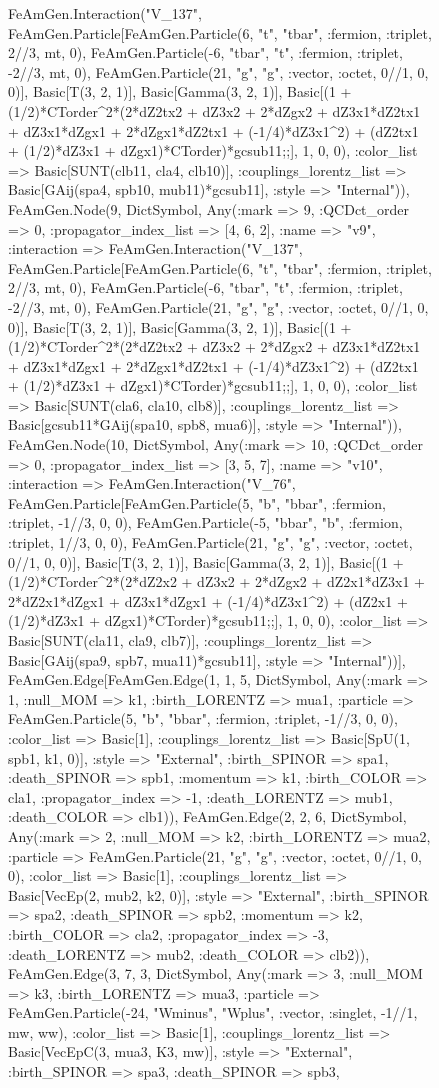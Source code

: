 \documentclass{revtex4}
\begin{document}
\begin{figure}[!htb]
\begin{center}
{FeAmGen.Interaction("V_137", FeAmGen.Particle[FeAmGen.Particle(6, "t", "tbar", :fermion, :triplet, 2//3, mt, 0), FeAmGen.Particle(-6, "tbar", "t", :fermion, :triplet, -2//3, mt, 0), FeAmGen.Particle(21, "g", "g", :vector, :octet, 0//1, 0, 0)], Basic[T(3, 2, 1)], Basic[Gamma(3, 2, 1)], Basic[(1 + (1/2)*CTorder^2*(2*dZ2tx2 + dZ3x2 + 2*dZgx2 + dZ3x1*dZ2tx1 + dZ3x1*dZgx1 + 2*dZgx1*dZ2tx1 + (-1/4)*dZ3x1^2) + (dZ2tx1 + (1/2)*dZ3x1 + dZgx1)*CTorder)*gcsub11;;], 1, 0, 0), :color_list => Basic[SUNT(clb11, cla4, clb10)], :couplings_lorentz_list => Basic[GAij(spa4, spb10, mub11)*gcsub11], :style => "Internal")), FeAmGen.Node(9, Dict{Symbol, Any}(:mark => 9, :QCDct_order => 0, :propagator_index_list => [4, 6, 2], :name => "v9", :interaction => FeAmGen.Interaction("V_137", FeAmGen.Particle[FeAmGen.Particle(6, "t", "tbar", :fermion, :triplet, 2//3, mt, 0), FeAmGen.Particle(-6, "tbar", "t", :fermion, :triplet, -2//3, mt, 0), FeAmGen.Particle(21, "g", "g", :vector, :octet, 0//1, 0, 0)], Basic[T(3, 2, 1)], Basic[Gamma(3, 2, 1)], Basic[(1 + (1/2)*CTorder^2*(2*dZ2tx2 + dZ3x2 + 2*dZgx2 + dZ3x1*dZ2tx1 + dZ3x1*dZgx1 + 2*dZgx1*dZ2tx1 + (-1/4)*dZ3x1^2) + (dZ2tx1 + (1/2)*dZ3x1 + dZgx1)*CTorder)*gcsub11;;], 1, 0, 0), :color_list => Basic[SUNT(cla6, cla10, clb8)], :couplings_lorentz_list => Basic[gcsub11*GAij(spa10, spb8, mua6)], :style => "Internal")), FeAmGen.Node(10, Dict{Symbol, Any}(:mark => 10, :QCDct_order => 0, :propagator_index_list => [3, 5, 7], :name => "v10", :interaction => FeAmGen.Interaction("V_76", FeAmGen.Particle[FeAmGen.Particle(5, "b", "bbar", :fermion, :triplet, -1//3, 0, 0), FeAmGen.Particle(-5, "bbar", "b", :fermion, :triplet, 1//3, 0, 0), FeAmGen.Particle(21, "g", "g", :vector, :octet, 0//1, 0, 0)], Basic[T(3, 2, 1)], Basic[Gamma(3, 2, 1)], Basic[(1 + (1/2)*CTorder^2*(2*dZ2x2 + dZ3x2 + 2*dZgx2 + dZ2x1*dZ3x1 + 2*dZ2x1*dZgx1 + dZ3x1*dZgx1 + (-1/4)*dZ3x1^2) + (dZ2x1 + (1/2)*dZ3x1 + dZgx1)*CTorder)*gcsub11;;], 1, 0, 0), :color_list => Basic[SUNT(cla11, cla9, clb7)], :couplings_lorentz_list => Basic[GAij(spa9, spb7, mua11)*gcsub11], :style => "Internal"))], FeAmGen.Edge[FeAmGen.Edge(1, 1, 5, Dict{Symbol, Any}(:mark => 1, :null_MOM => k1, :birth_LORENTZ => mua1, :particle => FeAmGen.Particle(5, "b", "bbar", :fermion, :triplet, -1//3, 0, 0), :color_list => Basic[1], :couplings_lorentz_list => Basic[SpU(1, spb1, k1, 0)], :style => "External", :birth_SPINOR => spa1, :death_SPINOR => spb1, :momentum => k1, :birth_COLOR => cla1, :propagator_index => -1, :death_LORENTZ => mub1, :death_COLOR => clb1)), FeAmGen.Edge(2, 2, 6, Dict{Symbol, Any}(:mark => 2, :null_MOM => k2, :birth_LORENTZ => mua2, :particle => FeAmGen.Particle(21, "g", "g", :vector, :octet, 0//1, 0, 0), :color_list => Basic[1], :couplings_lorentz_list => Basic[VecEp(2, mub2, k2, 0)], :style => "External", :birth_SPINOR => spa2, :death_SPINOR => spb2, :momentum => k2, :birth_COLOR => cla2, :propagator_index => -3, :death_LORENTZ => mub2, :death_COLOR => clb2)), FeAmGen.Edge(3, 7, 3, Dict{Symbol, Any}(:mark => 3, :null_MOM => k3, :birth_LORENTZ => mua3, :particle => FeAmGen.Particle(-24, "Wminus", "Wplus", :vector, :singlet, -1//1, mw, ww), :color_list => Basic[1], :couplings_lorentz_list => Basic[VecEpC(3, mua3, K3, mw)], :style => "External", :birth_SPINOR => spa3, :death_SPINOR => spb3, }
\end{center}
\end{figure}
\end{document}

